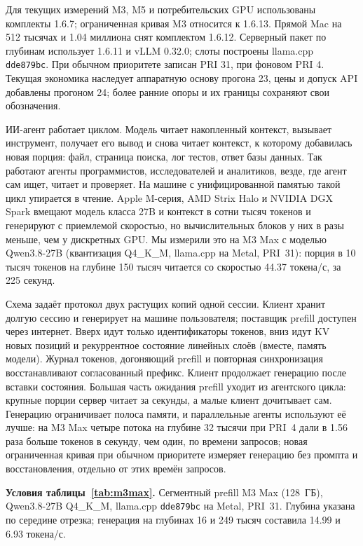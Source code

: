 Для текущих измерений M3, M5 и потребительских GPU использованы комплекты 1.6.7;
ограниченная кривая M3 относится к 1.6.13. Прямой Mac на 512 тысячах и 1.04 миллиона снят комплектом 1.6.12.
Серверный пакет по глубинам использует 1.6.11 и vLLM 0.32.0; слоты построены llama.cpp \texttt{dde879bc}.
При обычном приоритете записан PRI 31, при фоновом PRI 4. Текущая экономика наследует аппаратную основу
прогона 23, цены и допуск API добавлены прогоном 24; более ранние опоры и их границы сохраняют свои обозначения.

ИИ-агент работает циклом. Модель читает накопленный контекст, вызывает инструмент, получает его вывод и снова
читает контекст, к которому добавилась новая порция: файл, страница поиска, лог тестов, ответ базы данных. Так
работают агенты программистов, исследователей и аналитиков, везде, где агент сам ищет, читает и проверяет. На машине с
унифицированной памятью такой цикл упирается в чтение. Apple M-серия, AMD Strix Halo и NVIDIA DGX Spark вмещают модель
класса 27B и контекст в сотни тысяч токенов и генерируют с приемлемой скоростью, но вычислительных блоков у них в разы
меньше, чем у дискретных GPU. Мы измерили это на M3 Max с моделью Qwen3.8-27B (квантизация Q4\_K\_M, llama.cpp на
Metal, PRI~31): порция в 10 тысяч токенов на глубине 150 тысяч читается со скоростью 44.37 токена/с, за 225 секунд.

Схема задаёт протокол двух растущих копий одной сессии. Клиент хранит долгую сессию и генерирует на машине
пользователя; поставщик prefill доступен через интернет. Вверх идут только идентификаторы токенов,
вниз идут KV новых позиций и рекуррентное состояние линейных слоёв (вместе, память модели).
Журнал токенов, догоняющий prefill и повторная синхронизация восстанавливают согласованный префикс.
Клиент продолжает генерацию после вставки состояния. Большая часть ожидания prefill уходит из агентского цикла: крупные порции сервер читает за секунды, а малые
клиент дочитывает сам. Генерацию ограничивает полоса памяти, и
параллельные агенты используют её лучше: на M3 Max четыре потока на глубине 32 тысячи при PRI~4 дали в 1.56 раза больше токенов в секунду, чем один, по времени запросов; новая ограниченная кривая при обычном приоритете измеряет генерацию без промпта и восстановления, отдельно от этих времён запросов.

\textbf{Условия таблицы~\ref{tab:m3max}.} Сегментный prefill M3 Max (128~ГБ), Qwen3.8-27B Q4\_K\_M,
llama.cpp \texttt{dde879bc} на Metal, PRI~31. Глубина указана по середине отрезка;
генерация на глубинах 16 и 249 тысяч составила 14.99 и 6.93 токена/с.

